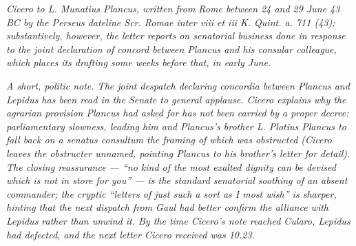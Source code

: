 
\textit{Cicero to L. Munatius Plancus, written from Rome
between 24 and 29 June 43 BC by the Perseus dateline
\textit{Scr. Romae inter viii et iii K. Quint. a. 711 (43)};
substantively, however, the letter reports on senatorial
business done in response to the joint declaration of
concord between Plancus and his consular colleague,
which places its drafting some weeks before that, in
early June.}

\textit{A short, politic note. The joint despatch
declaring \textit{concordia} between Plancus and Lepidus
has been read in the Senate to general applause. Cicero
explains why the agrarian provision Plancus had asked
for has not been carried by a proper decree: parliamentary
slowness, leading him and Plancus's brother L. Plotius
Plancus to fall back on a senatus consultum the framing
of which was obstructed (Cicero leaves the obstructer
unnamed, pointing Plancus to his brother's letter for
detail). The closing reassurance --- ``no kind of the
most exalted dignity can be devised which is not in store
for you'' --- is the standard senatorial soothing of an
absent commander; the cryptic ``letters of just such a
sort as I most wish'' is sharper, hinting that the next
dispatch from Gaul had better confirm the alliance with
Lepidus rather than unwind it. By the time Cicero's note
reached Cularo, Lepidus had defected, and the next
letter Cicero received was 10.23.}
